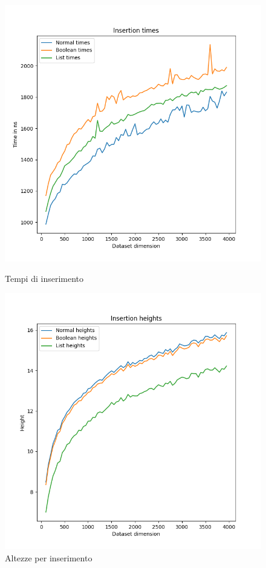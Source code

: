 \begin{figure}[H]
  \centering
  \begin{minipage}{.5\textwidth}
    \centering
    \includegraphics[width=0.7\linewidth]{Resources/ABR_Resources/InsertionTimes.png}
    \caption{Tempi di inserimento}
    \label{fig:InsTimes}
  \end{minipage}%
  \hfil %
  \begin{minipage}{.5\textwidth}
    \centering
    \includegraphics[width=0.7\linewidth]{Resources/ABR_Resources/InsertionHeights.png}
    \caption{Altezze per inserimento}
    \label{fig:InsHeights}
  \end{minipage}%
\end{figure}

